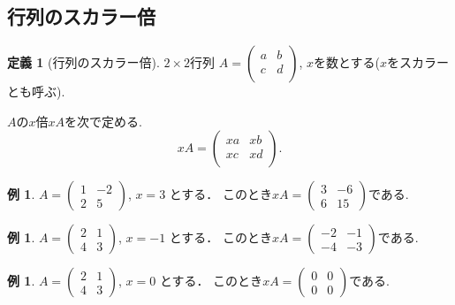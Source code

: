 \documentclass[dvipdfmx,a4paper,11pt]{article}
\theoremstyle{definition}
\newtheorem{dfn}[thm]{定義}
\newtheorem{exa}[thm]{例}
\begin{document}
 \subsection{行列のスカラー倍}
 
  \begin{tcolorbox}[
    colback = white,
    colframe = green!35!black,
    fonttitle = \bfseries,
    breakable = true]
    \begin{dfn}[行列のスカラー倍]
    \text{}
    
$2 \times 2$行列
$
A=\begin{pmatrix}
a& b \\
c& d \\
\end{pmatrix}
$, $x$を数とする($x$をスカラーとも呼ぶ).

$A$の$x$倍$xA$を次で定める.
$$
xA=
\begin{pmatrix}
xa&xb \\
xc&xd \\
\end{pmatrix}.
$$
  \end{dfn}
 \end{tcolorbox}

\begin{exa}
 $A = 
 \begin{pmatrix}
 1 &-2 \\
 2&5
 \end{pmatrix}
 $,
 $
 x =3
 $
 とする．
 このとき$
 xA =
 \begin{pmatrix}
 3 &-6 \\
 6&15
 \end{pmatrix}
 $である.
 \end{exa}
 \begin{exa}
 $A = 
 \begin{pmatrix}
 2&1 \\
 4&3
 \end{pmatrix}
 $, 
 $
 x =-1
 $
 とする．
 このとき$
 xA =
 \begin{pmatrix}
 -2 &-1 \\
-4&-3
 \end{pmatrix}
 $である.
 \end{exa}
  \begin{exa}
 $A = 
 \begin{pmatrix}
 2&1 \\
 4&3
 \end{pmatrix}
 $, 
 $
 x =0
 $
 とする．
 このとき$
 xA =
 \begin{pmatrix}
 0&0\\
0&0
 \end{pmatrix}
 $である.
 \end{exa}
 
\end{document}
